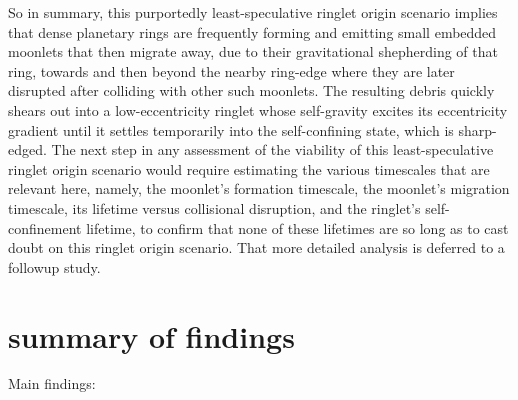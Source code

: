 \documentclass[preprint]{aastex62}
\begin{document}
So in summary, this purportedly least-speculative ringlet origin scenario
implies that dense planetary rings are frequently forming and emitting small embedded moonlets that then migrate away, 
due to their gravitational shepherding of that ring, towards and then beyond the nearby ring-edge
where they are later disrupted after colliding with other such moonlets. The resulting debris quickly
shears out into a low-eccentricity ringlet whose self-gravity excites its eccentricity gradient
until it settles temporarily into the self-confining state, which is sharp-edged. 
The next step in any assessment of the viability
of this least-speculative ringlet origin scenario would require estimating the various timescales that are relevant here,
namely, the moonlet's formation timescale, the moonlet's migration timescale, its lifetime versus collisional
disruption, and the ringlet's self-confinement lifetime, to confirm that none of these lifetimes are so
long as to cast doubt on this ringlet origin scenario. That more detailed analysis is deferred to a followup
study.


\section{summary of findings}
\label{sec:summary}

Main findings:
\end{document}
